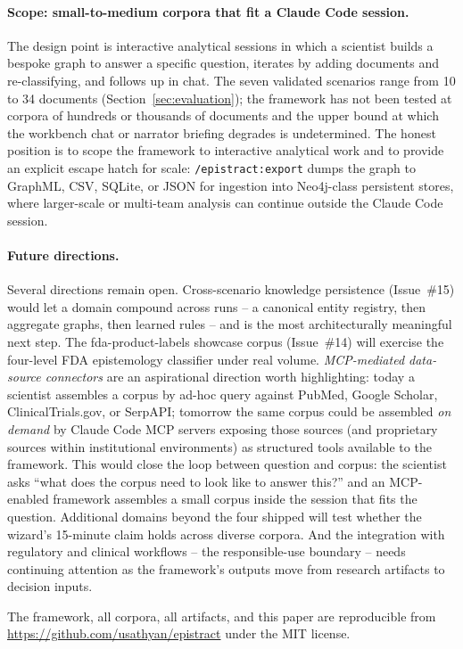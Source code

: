\paragraph{Scope: small-to-medium corpora that fit a Claude Code session.} The design point is interactive analytical sessions in which a scientist builds a bespoke graph to answer a specific question, iterates by adding documents and re-classifying, and follows up in chat. The seven validated scenarios range from 10 to 34 documents (Section~\ref{sec:evaluation}); the framework has not been tested at corpora of hundreds or thousands of documents and the upper bound at which the workbench chat or narrator briefing degrades is undetermined. The honest position is to scope the framework to interactive analytical work and to provide an explicit escape hatch for scale: \texttt{/epistract:export} dumps the graph to GraphML, CSV, SQLite, or JSON for ingestion into Neo4j-class persistent stores, where larger-scale or multi-team analysis can continue outside the Claude Code session.

\paragraph{Future directions.} Several directions remain open. Cross-scenario knowledge persistence (Issue~\#15) would let a domain compound across runs -- a canonical entity registry, then aggregate graphs, then learned rules -- and is the most architecturally meaningful next step. The fda-product-labels showcase corpus (Issue~\#14) will exercise the four-level FDA epistemology classifier under real volume. \emph{MCP-mediated data-source connectors} are an aspirational direction worth highlighting: today a scientist assembles a corpus by ad-hoc query against PubMed, Google Scholar, ClinicalTrials.gov, or SerpAPI; tomorrow the same corpus could be assembled \emph{on demand} by Claude Code MCP servers exposing those sources (and proprietary sources within institutional environments) as structured tools available to the framework. This would close the loop between question and corpus: the scientist asks ``what does the corpus need to look like to answer this?'' and an MCP-enabled framework assembles a small corpus inside the session that fits the question. Additional domains beyond the four shipped will test whether the wizard's 15-minute claim holds across diverse corpora. And the integration with regulatory and clinical workflows -- the responsible-use boundary -- needs continuing attention as the framework's outputs move from research artifacts to decision inputs.

The framework, all corpora, all artifacts, and this paper are reproducible from \url{https://github.com/usathyan/epistract} under the MIT license.
